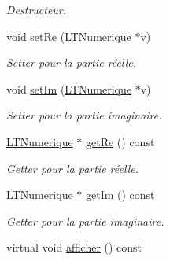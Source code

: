 \begin{DoxyCompactItemize}
\begin{DoxyCompactList}\small\item\em Destructeur. \end{DoxyCompactList}\item 
void \hyperlink{class_l_t_complexe_af222794c3f8682060ed0b0cc47f1d2af}{set\+Re} (\hyperlink{class_l_t_numerique}{L\+T\+Numerique} $\ast$v)
\begin{DoxyCompactList}\small\item\em Setter pour la partie réelle. \end{DoxyCompactList}\item 
void \hyperlink{class_l_t_complexe_aa826f44d94f70c341a93d8b0f640a9cd}{set\+Im} (\hyperlink{class_l_t_numerique}{L\+T\+Numerique} $\ast$v)
\begin{DoxyCompactList}\small\item\em Setter pour la partie imaginaire. \end{DoxyCompactList}\item 
\hyperlink{class_l_t_numerique}{L\+T\+Numerique} $\ast$ \hyperlink{class_l_t_complexe_a26dac188af47517274c91ed6884ba324}{get\+Re} () const 
\begin{DoxyCompactList}\small\item\em Getter pour la partie réelle. \end{DoxyCompactList}\item 
\hyperlink{class_l_t_numerique}{L\+T\+Numerique} $\ast$ \hyperlink{class_l_t_complexe_afebf1f447b2d97df62da17ea479e47f3}{get\+Im} () const 
\begin{DoxyCompactList}\small\item\em Getter pour la partie imaginaire. \end{DoxyCompactList}\item 
virtual void \hyperlink{class_l_t_complexe_a5caf7aa1d3123a03294fac536aadf6b1}{afficher} () const \hypertarget{class_l_t_complexe_a5caf7aa1d3123a03294fac536aadf6b1}{}\label{class_l_t_complexe_a5caf7aa1d3123a03294fac536aadf6b1}


\end{DoxyCompactItemize}
